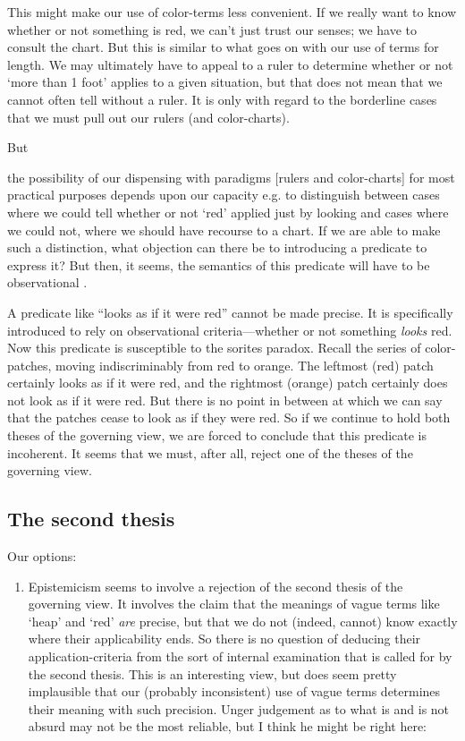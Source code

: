 \documentclass[11pt]{standalone}
\newenvironment{squote}{%
\begin{spacing}{1}
       	\begin{list}{}{%
\setlength{\labelwidth}{0pt}%
\rightmargin\leftmargin%
}
\item\relax
}{%
\end{list}%
\end{spacing}
}
\begin{document}
\begin{spacing}{1.5}
This might make our use of color-terms less convenient.  If we really
want to know whether or not something is red, we can't just trust our
senses; we have to consult the chart.  But this is similar to what
goes on with our use of terms for length.  We may ultimately have to
appeal to a ruler to determine whether or not `more than 1 foot'
applies to a given situation, but that does not mean that we cannot
often tell without a ruler.  It is only with regard to the borderline
cases that we must pull out our rulers (and color-charts).

But

\begin{squote}
the possibility of our dispensing with paradigms [rulers and
  color-charts] for most practical purposes depends upon our capacity
e.g. to distinguish between cases where we could tell whether or not
`red' applied just by looking and cases where we could not, where we
should have recourse to a chart.  If we are able to make such a
distinction, what objection can there be to introducing a predicate to
express it?  But then, it seems, the semantics of this predicate will
have to be observational \citep[359]{wright1975}.
\end{squote}

A predicate like ``looks as if it were red'' cannot be made precise.
It is specifically introduced to rely on observational
criteria---whether or not something {\em looks} red.  Now this
predicate is susceptible to the sorites paradox.  Recall the series of
color-patches, moving indiscriminably from red to orange.  The
leftmost (red) patch certainly looks as if it were red, and the
rightmost (orange) patch certainly does not look as if it were red.
But there is no point in between at which we can say that the patches
cease to look as if they were red.  So if we continue to hold both
theses of the governing view, we are forced to conclude that this
predicate is incoherent.  It seems that we must, after all, reject one
of the theses of the governing view.

\subsection{The second thesis}
Our options:
\begin{enumerate}
  \item Epistemicism seems to involve a rejection of the second thesis
    of the governing view.  It involves the claim that the meanings of
    vague terms like `heap' and `red' {\em are} precise, but that we
    do not (indeed, cannot) know exactly where their applicability
    ends.  So there is no question of deducing their
    application-criteria from the sort of internal examination that is
    called for by the second thesis.  This is an interesting view, but
    does seem pretty implausible that our (probably inconsistent) use
    of vague terms determines their meaning with such precision.
    Unger judgement as to what is and is not absurd may not be the
    most reliable, but I think he might be right here:


\end{enumerate}
\end{spacing}
\end{document}
